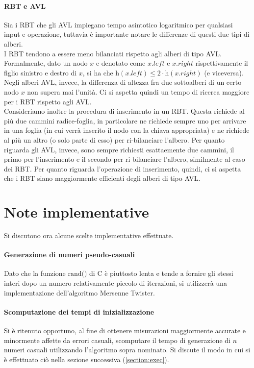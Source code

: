 \documentclass{article}
\begin{document}
	\paragraph{RBT e AVL}
	\label{par:rbt_avl}
	Sia i RBT che gli AVL impiegano tempo asintotico logaritmico per qualsiasi input e operazione, tuttavia è importante notare le differenze di questi due tipi di alberi.\\
	I RBT tendono a essere meno bilanciati rispetto agli alberi di tipo AVL. Formalmente, dato un nodo $x$ e denotato come $x.left$ e $x.right$ rispettivamente il figlio sinistro e destro di $x$, si ha che $\text{h}\left(x.left\right) \leq 2\cdot \text{h}\left(x.right\right)$ (e viceversa). Negli alberi AVL, invece, la differenza di altezza fra due sottoalberi di un certo nodo $x$ non supera mai l'unità. Ci si aspetta quindi un tempo di ricerca maggiore per i RBT rispetto agli AVL. \\
	Consideriamo inoltre la procedura di inserimento in un RBT. Questa richiede al più due cammini radice-foglia, in particolare ne richiede sempre uno per arrivare in una foglia (in cui verrà inserito il nodo con la chiava appropriata) e ne richiede al più un altro (o solo parte di esso) per ri-bilanciare l'albero. Per quanto riguarda gli AVL, invece, sono sempre richiesti esattaemente due cammini, il primo per l'inserimento e il secondo per ri-bilanciare l'albero, similmente al caso dei RBT. Per quanto riguarda l'operazione di inserimento, quindi, ci si aspetta che i RBT siano maggiormente efficienti degli alberi di tipo AVL.
	
	\newpage
	
	\section{Note implementative}
	\label{section:impl_notes}
	Si discutono ora alcune scelte implementative effettuate.
	
	\paragraph{Generazione di numeri pseudo-casuali}
	Dato che la funzione $\text{rand()}$ di C è piuttosto lenta e tende a fornire gli stessi interi dopo un numero relativamente piccolo di iterazioni, si utilizzerà una implementazione dell'algoritmo Mersenne Twister.
	
	\paragraph{Scomputazione dei tempi di inizializzazione}
	Si è ritenuto opportuno, al fine di ottenere misurazioni maggiormente accurate e minormente affette da errori casuali, scomputare il tempo di generazione di $n$ numeri casuali utilizzando l'algoritmo sopra nominato. Si discute il modo in cui si è effettuato ciò nella sezione successiva (\ref{section:exec}).
	
\end{document}
